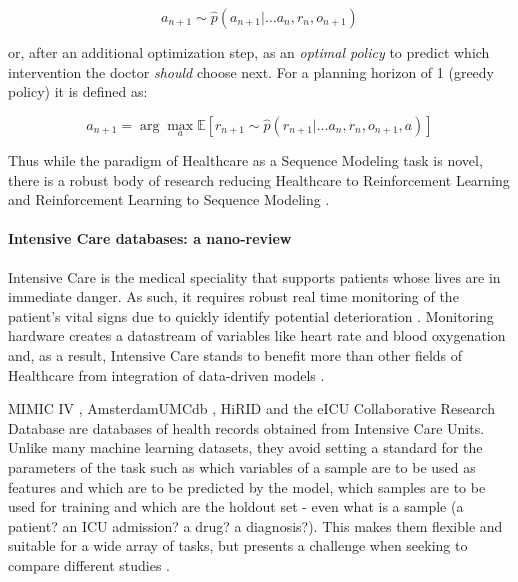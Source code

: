 \begin{equation}
    a_{n+1} \sim \hat{p}(a_{n+1} | \dots a_n, r_n, o_{n+1})
\end{equation}

or, after an additional optimization step, as an \emph{optimal policy} to predict which intervention the doctor \emph{should} choose next.
For a planning horizon of 1 (greedy policy) it is defined as:

\begin{equation}
    a_{n+1} = \arg \max_a \mathbb{E} [r_{n+1} \sim \hat{p}(r_{n+1} | \dots a_n, r_n, o_{n+1}, a)]
\end{equation}

Thus while the paradigm of Healthcare as a Sequence Modeling task is novel, there is a robust body of research reducing Healthcare to Reinforcement Learning \cite{yuReinforcementLearningHealthcare2021} and Reinforcement Learning to Sequence Modeling \cite{chenDecisionTransformerReinforcement2021, jannerOfflineReinforcementLearning2021, schmidhuberReinforcementLearningUpside2020}. 

\paragraph{Intensive Care databases: a nano-review}

Intensive Care is the medical speciality that supports patients whose lives are in immediate danger.
As such, it requires robust real time monitoring of the patient's vital signs due to quickly identify potential deterioration \cite{Bailey2013trial, Blount2010Real, Bockholt2022Real, Dimitrios1999Distributed, Fried2000Some, Mao2012integrated, Prgomet2016Vital, Vincent2018Improving}.
Monitoring hardware creates a datastream of variables like heart rate and blood oxygenation and, as a result, Intensive Care stands to benefit more than other fields of Healthcare from integration of data-driven models \cite{nunezreizBigDataAnalysis2019}.

MIMIC IV \cite{johnsonMIMICIVFreelyAccessible2023}, AmsterdamUMCdb \cite{amsterdamumcdb-a}, HiRID \cite{yecheHiRIDICUBenchmarkComprehensiveMachine} and the eICU Collaborative Research Database \cite{pollard2018a} are databases of health records obtained from Intensive Care Units.
Unlike many machine learning datasets, they avoid setting a standard for the parameters of the task such as which variables of a sample are to be used as features and which are to be predicted by the model, which samples are to be used for training and which are the holdout set - even what is a sample (a patient? an ICU admission? a drug? a diagnosis?). This makes them flexible and suitable for a wide array of tasks, but presents a challenge when seeking to compare different studies \cite{mcdermottReproducibilityMachineLearning2021}.

